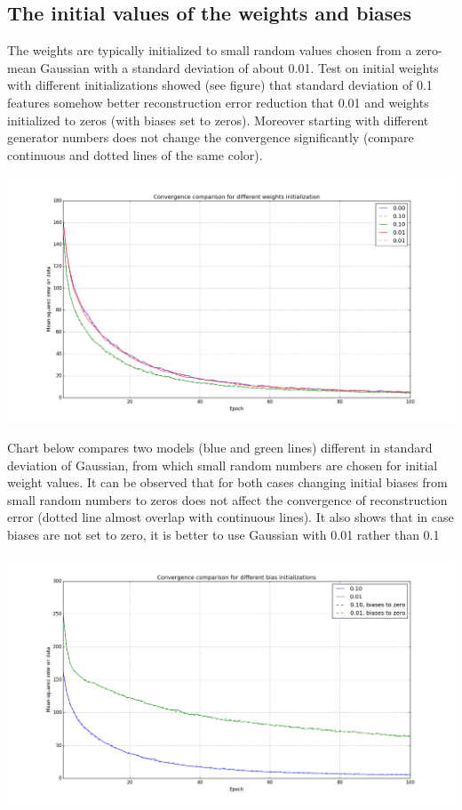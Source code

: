 \documentclass[a4paper]{scrartcl}
\begin{document}
\subsection{The initial values of the weights and biases}
The weights are typically initialized to small random values chosen from a zero-mean Gaussian with a standard deviation of about 0.01. Test on initial weights with different initializations showed (see figure) that standard deviation of 0.1 features somehow better reconstruction error reduction that 0.01 and weights initialized to zeros (with biases set to zeros).
Moreover starting with different generator numbers does not change the convergence significantly (compare continuous and dotted lines of the same color).
\begin{center}
\includegraphics[width=14cm]{images/weights_seeds.png}
\end{center}
Chart below compares two models (blue and green lines) different in standard deviation of Gaussian, from which small random numbers are chosen for initial weight values. It can be observed that for both cases changing initial biases from small random numbers to zeros does not affect the convergence of reconstruction error (dotted line almost overlap with continuous lines). It also shows that in case biases are not set to zero, it is better to use Gaussian with 0.01 rather than 0.1
\begin{center}
\includegraphics[width=14cm]{images/bias.png}
\end{center}
\end{document}

